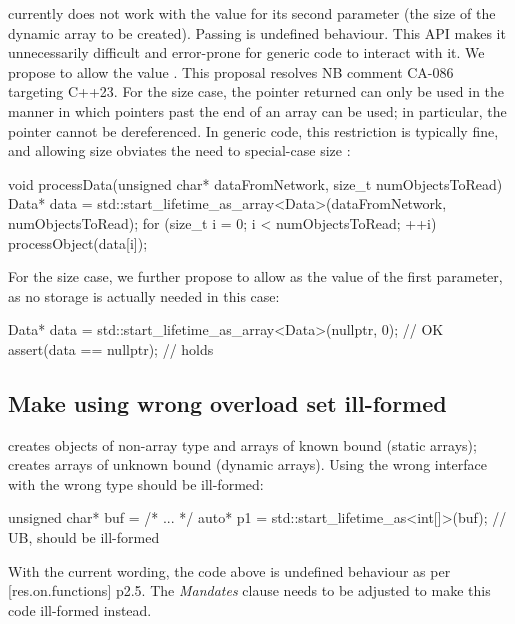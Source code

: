 \mbox{} currently does not work with the value  for its second parameter (the size of the dynamic array to be created). Passing  is undefined behaviour. This API makes it unnecessarily difficult and error-prone for generic code to interact with it. We propose to allow the value . This proposal resolves NB comment CA-086 targeting C++23. For the size  case, the pointer returned can only be used in the manner in which pointers past the end of an array can be used; in particular, the pointer cannot be dereferenced. In generic code, this restriction is typically fine, and allowing size  obviates the need to special-case size :

\begin{codeblock}
void processData(unsigned char* dataFromNetwork, size_t numObjectsToRead) {
    Data* data = std::start_lifetime_as_array<Data>(dataFromNetwork, numObjectsToRead);
    for (size_t i = 0; i < numObjectsToRead; ++i)
       processObject(data[i]);
}
\end{codeblock}

For the size  case, we further propose to allow  as the value of the first parameter, as no storage is actually needed in this case:

\begin{codeblock}
Data* data = std::start_lifetime_as_array<Data>(nullptr, 0);  // OK
assert(data == nullptr); // holds
\end{codeblock}

\subsection{Make using wrong overload set ill-formed}

\mbox{} creates objects of non-array type and arrays of known bound (static arrays); \mbox{} creates arrays of unknown bound (dynamic arrays). Using the wrong interface with the wrong type should be ill-formed:

\begin{codeblock}
unsigned char* buf = /* ... */
auto* p1 = std::start_lifetime_as<int[]>(buf); // UB, should be ill-formed
\end{codeblock}
With the current wording, the code above is undefined behaviour as per [res.on.functions] p2.5. The \emph{Mandates} clause needs to be adjusted to make this code ill-formed instead.

